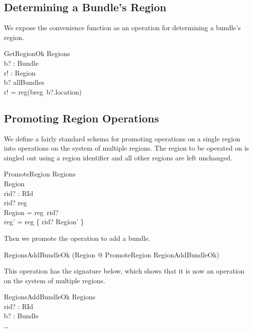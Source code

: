 \documentclass[a4paper,9pt,twoside]{article}
\begin{document}
\subsection{Determining a Bundle's Region}

We expose the convenience function as an operation for determining a bundle's region.
\begin{schema}{GetRegionOk}
  \Xi Regions \\
  b? : Bundle \\
  r! : Region \\
\where
  b? \in allBundles \\
  r! = reg(breg~b?.location) \\
\end{schema}

\subsection{Promoting Region Operations}

We define a fairly standard schema for promoting operations on a single region into
operations on the system of multiple regions.
The region to be operated on is singled out using a region identifier and all other regions are left
unchanged.
\begin{schema}{PromoteRegion}
  \Delta Regions \\
  \Delta Region \\
  rid? : RId \\
\where
  rid? \in \dom reg \\
  \theta Region = reg~rid? \\
  reg' = reg \oplus \{ rid? \mapsto \theta Region' \} \\
\end{schema}

Then we promote the operation to add a bundle.
\begin{zed}
  RegionsAddBundleOk  (\exists \Delta Region @ PromoteRegion \land RegionAddBundleOk) \\
\end{zed}

This operation has the signature below, which shows that it is now an operation on the
system of multiple regions.
\begin{schema}{RegionsAddBundleOk}
  \Delta Regions \\
  rid? : RId \\
  b? : Bundle \\
\where
  \ldots
\end{schema}
\end{document}
